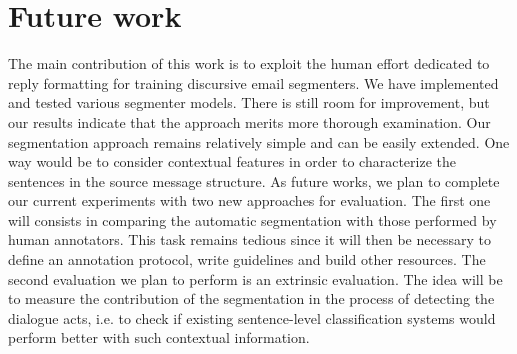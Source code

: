 

\section{Future work}
\label{sec:futureWork}

The main contribution of this work is to exploit the human effort dedicated to reply formatting for training discursive email segmenters. 
We have implemented and tested various segmenter models. 
There is still room for improvement, but our results indicate that the approach merits more thorough examination.
%
Our segmentation approach remains relatively simple and can be easily extended. One way would be to consider contextual features in order to characterize the sentences in the source message structure.
%
As future works, we plan to complete our current experiments with two new approaches for evaluation. The first one will consists in comparing the automatic segmentation with those performed by human annotators.
This task remains tedious since it will then be necessary to define an annotation protocol, write guidelines and build other resources.
The second evaluation we plan to perform is an extrinsic evaluation. The idea will be to measure the contribution of the segmentation in the process of detecting the dialogue acts, i.e. to check if existing sentence-level classification systems would perform better with such contextual information. %

